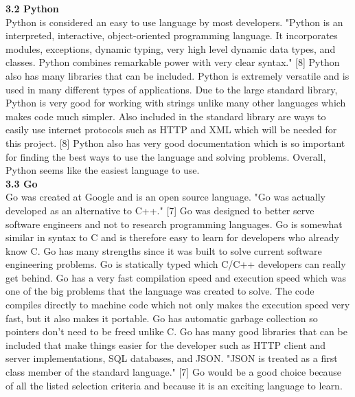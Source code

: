 \documentclass[letterpaper,10pt,draftclsnofoot,onecolumn,]{IEEEtran}
\begin{document}
\textbf{3.2 Python}\\
Python is considered an easy to use language by most developers. "Python is an interpreted, interactive, object-oriented programming language. It incorporates modules, exceptions, dynamic typing, very high level dynamic data types, and classes. Python combines remarkable power with very clear syntax." [8] Python also has many libraries that can be included. Python is extremely versatile and is used in many different types of applications. Due to the large standard library, Python is very good for working with strings unlike many other languages which makes code much simpler. Also included in the standard library are ways to easily use internet protocols such as HTTP and XML which will be needed for this project. [8] Python also has very good documentation which is so important for finding the best ways to use the language and solving problems. Overall, Python seems like the easiest language to use.\\

\textbf{3.3 Go}\\
Go was created at Google and is an open source language. "Go was actually developed as an alternative to C++." [7] Go was designed to better serve software engineers and not to research programming languages. Go is somewhat similar in syntax to C and is therefore easy to learn for developers who already know C. Go has many strengths since it was built to solve current software engineering problems. Go is statically typed which C/C++ developers can really get behind. Go has a very fast compilation speed and execution speed which was one of the big problems that the language was created to solve. The code compiles directly to machine code which not only makes the execution speed very fast, but it also makes it portable. Go has automatic garbage collection so pointers don't need to be freed unlike C. Go has many good libraries that can be included that make things easier for the developer such as HTTP client and server implementations, SQL databases, and JSON. "JSON is treated as a first class member of the standard language." [7] Go would be a good choice because of all the listed selection criteria and because it is an exciting language to learn.\\
\end{document}
